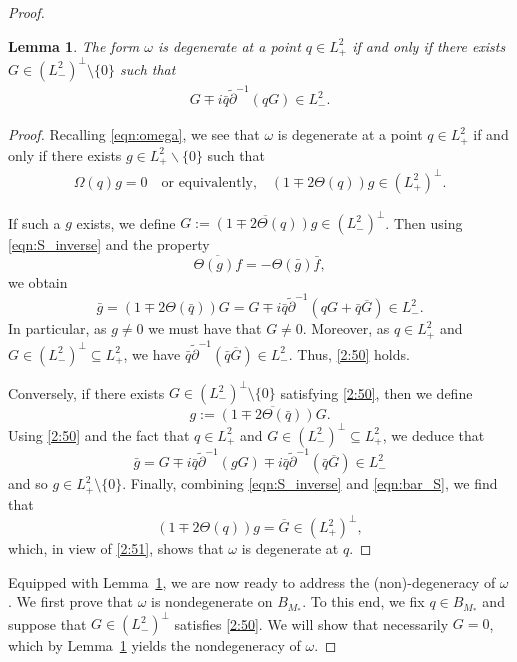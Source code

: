 \documentclass{amsart}
\numberwithin{equation}{section}
\newtheorem{lemma}[theorem]{Lemma}
\theoremstyle{definition}
\newcommand{\om}{\omega}
\newcommand{\Om}{\Omega}
\newcommand{\dd}{\partial}
\newcommand{\qtq}[1]{\quad\text{#1}\quad}
\newcommand{\widebar}{\overline}
\begin{document}
\begin{proof}
\begin{lemma}\label{lem:lem3.2}
The form $\om$ is degenerate at a point $q\in L^2_+$ if and only if there exists $G\in (L^2_-)^{\perp}\setminus\{0\}$ such that
\begin{align}\label{2:50}
G\mp i\bar{q}\tilde{\dd}^{-1}(qG)\in L^2_-.
\end{align}
\end{lemma}

\begin{proof}
Recalling \eqref{eqn:omega}, we see that $\om$ is degenerate at a point $q\in L^2_+$ if and only if there exists $g\in L^2_+\backslash\{0\}$ such that
\begin{align}\label{2:51}
\Om (q)g=0 \qtq{or equivalently,} (1\mp 2 \Theta (q))g\in (L^2_+)^{\perp}.
\end{align}

If such a $g$ exists, we define $G:=\overline{(1\mp2\Theta(q))g}\in (L^2_-)^{\perp}$. Then using \eqref{eqn:S_inverse} and the property
\begin{equation}\label{eqn:bar_S} 
\overline{\Theta(g)f}= - \Theta(\bar{g})\bar{f},
\end{equation}
we obtain
\begin{equation}\label{eqn:gbar}
\bar{g}=(1\mp 2\Theta(\bar{q})){G}={G}\mp i\bar{q}\tilde{\dd}^{-1}(q{G}+\bar{q}\widebar{G})\in L^2_-.
\end{equation}
In particular, as $g\neq 0$ we must have that $G\neq0$. Moreover, as $q\in L^2_+$ and $G\in (L^2_-)^{\perp}\subseteq L^2_+$, we have $\bar{q}\tilde{\dd}^{-1}(\bar{q}\widebar{G})\in L^2_-$.  Thus, \eqref{2:50} holds.

Conversely, if there exists $G\in (L^2_-)^{\perp}\setminus\{0\}$ satisfying \eqref{2:50}, then we define
$$
g:=\overline{(1\mp 2\Theta(\bar q))G}.
$$
Using \eqref{2:50} and the fact that $q\in L^2_+$ and $G\in (L^2_-)^{\perp}\subseteq L^2_+$, we deduce that 
$$
\bar g = G\mp i\bar q \tilde{\dd}^{-1}(gG) \mp i\bar q \tilde{\dd}^{-1}(\bar{q}\widebar{G}) \in L^2_-
$$
and so $g\in L^2_+\setminus\{0\}$.  Finally, combining \eqref{eqn:S_inverse} and \eqref{eqn:bar_S}, we find that
$$
(1\mp 2\Theta(q))g=\widebar{G}\in (L^2_+)^\perp,
$$
which, in view of \eqref{2:51}, shows that $\om$ is degenerate at $q$.
\end{proof}

Equipped with Lemma~\ref{lem:lem3.2}, we are now ready to address the (non)-degeneracy of $\om$. We first prove that $\om$ is nondegenerate on $B_{M_*}$.  To this end, we fix $q\in B_{M_*}$ and suppose that $G\in (L^2_-)^{\perp}$ satisfies \eqref{2:50}. We will show that necessarily $G=0$, which by Lemma~\ref{lem:lem3.2} yields the nondegeneracy of $\om$.


\end{proof}
\end{document}
